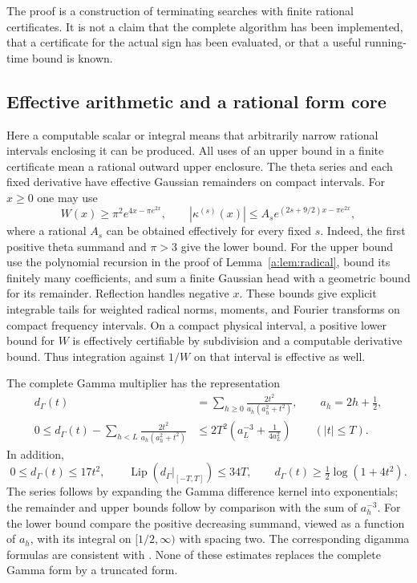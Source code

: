 The proof is a construction of terminating searches with finite rational
certificates.  It is not a claim that the complete algorithm has been
implemented, that a certificate for the actual sign has been evaluated, or that
a useful running-time bound is known.

\subsection{Effective arithmetic and a rational form core}
\label{vfourC:subsec:arithmetic}

Here a computable scalar or integral means that arbitrarily narrow rational
intervals enclosing it can be produced.  All uses of an upper bound in a finite
certificate mean a rational outward upper enclosure.  The theta series and each
fixed derivative have effective Gaussian remainders on compact intervals.  For
$x\ge0$ one may use
\begin{equation}\label{vfourC:eq:theta}
 W(x)\ge\pi^2 e^{4x-\pi e^{2x}},\qquad
 |\kappa^{(s)}(x)|\le A_s e^{(2s+9/2)x-\pi e^{2x}},
\end{equation}
where a rational $A_s$ can be obtained effectively for every fixed $s$.
Indeed, the first positive theta summand and $\pi>3$ give the lower bound.
For the upper bound use the polynomial recursion in the proof of
Lemma~\ref{a:lem:radical}, bound its finitely many coefficients, and sum a finite
Gaussian head with a geometric bound for its remainder.  Reflection handles
negative $x$.  These bounds give explicit integrable tails for weighted radical
norms, moments, and Fourier transforms on compact frequency intervals.  On a
compact physical interval, a positive lower bound for $W$ is effectively
certifiable by subdivision and a computable derivative bound.  Thus integration
against $1/W$ on that interval is effective as well.

The complete Gamma multiplier has the representation
\begin{equation}\label{vfourC:eq:gamma}
 \begin{split}
 d_\Gamma(t)&=\sum_{h\ge0}\frac{2t^2}{a_h(a_h^2+t^2)},
       \qquad a_h=2h+\tfrac12,\\
 0\le d_\Gamma(t)-\sum_{h<L}\frac{2t^2}{a_h(a_h^2+t^2)}
   &\le2T^2\left(a_L^{-3}+\frac1{4a_L^2}\right)
       \qquad(|t|\le T).
 \end{split}
\end{equation}
In addition,
\begin{equation}\label{vfourC:eq:gamma-bounds}
 0\le d_\Gamma(t)\le17t^2,\qquad
 \operatorname{Lip}(d_\Gamma|_{[-T,T]})\le34T,\qquad
 d_\Gamma(t)\ge\tfrac12\log(1+4t^2).
\end{equation}
The series follows by expanding the Gamma difference kernel into exponentials;
the remainder and upper bounds follow by comparison with the sum of $a_h^{-3}$.
For the lower bound compare the positive decreasing summand, viewed as a
function of $a_h$, with its integral on $[1/2,\infty)$ with spacing two.
The corresponding digamma formulas are consistent with
\cite[Eq.~5.9.16 and Eq.~5.11.2]{DLMF}.  None of these estimates replaces the
complete Gamma form by a truncated form.

